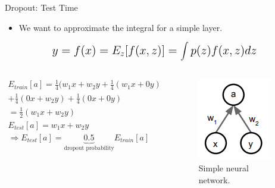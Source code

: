 \begin{frame}{Dropout: Test Time}
	\begin{itemize}
		\item We want to approximate the integral for a simple layer.
	\end{itemize}
	\begin{equation*}
		\mathlarger{\mathlarger{
			y = f(x) = E_z[f(x, z)] = \int p(z)f(x, z) dz
		}}
	\end{equation*}
	\begin{columns}
		\begin{column}{0.5\textwidth}
			\begin{align*}
				E_{train}[a] = \frac{1}{4}(w_1 x + w_2 y
				+ \frac{1}{4}(w_1 x + 0 y) \\
				+ \frac{1}{4}(0 x + w_2 y) + \frac{1}{4}(0 x + 0 y) \\
				= \frac{1}{2}(w_1 x + w_2 y) \\
				E_{test}[a] = w_1 x + w_2 y \\
				\Rightarrow E_{test}[a] = \underbrace{0.5}_{\text{dropout probability}} E_{train}[a]
			\end{align*}
		\end{column}
		\begin{column}{0.5\textwidth}
			\begin{figure}[H]
				\centering
				\includegraphics[height=0.4\textheight]{Figs/section_4/dropout_test.png}
				\caption{Simple neural network. \cite{cs231n-2018-lecture7}}
			\end{figure}
		\end{column}
	\end{columns}
\end{frame}



